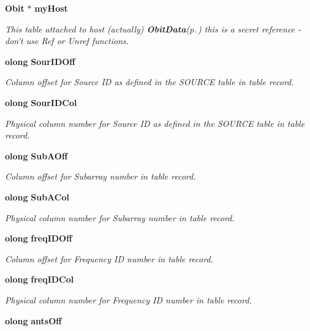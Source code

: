 \begin{CompactItemize}
{\bf Obit} $\ast$ {\bf my\-Host}
\begin{CompactList}\small\item\em This table attached to host (actually) {\bf Obit\-Data}{\rm (p.\,\pageref{structObitData})} this is a secret reference - don't use Ref or Unref functions. \item\end{CompactList}\item 
{\bf olong} {\bf Sour\-IDOff}
\begin{CompactList}\small\item\em Column offset for Source ID as defined in the SOURCE table in table record. \item\end{CompactList}\item 
{\bf olong} {\bf Sour\-IDCol}
\begin{CompactList}\small\item\em Physical column number for Source ID as defined in the SOURCE table in table record. \item\end{CompactList}\item 
{\bf olong} {\bf Sub\-AOff}
\begin{CompactList}\small\item\em Column offset for Subarray number in table record. \item\end{CompactList}\item 
{\bf olong} {\bf Sub\-ACol}
\begin{CompactList}\small\item\em Physical column number for Subarray number in table record. \item\end{CompactList}\item 
{\bf olong} {\bf freq\-IDOff}
\begin{CompactList}\small\item\em Column offset for Frequency ID number in table record. \item\end{CompactList}\item 
{\bf olong} {\bf freq\-IDCol}
\begin{CompactList}\small\item\em Physical column number for Frequency ID number in table record. \item\end{CompactList}\item 
{\bf olong} {\bf ants\-Off}

\end{CompactItemize}
